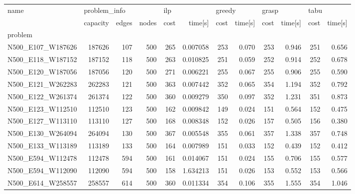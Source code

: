 \begin{landscape}
\begin{table}
\centering
\begin{tabular}{lrrrrrrrrrrr}
\toprule
name & \multicolumn{3}{l}{problem\_info} & \multicolumn{2}{l}{ilp} & \multicolumn{2}{l}{greedy} & \multicolumn{2}{l}{grasp} & \multicolumn{2}{l}{tabu} \\
{} &     capacity & edges & nodes & cost &   time[s] &   cost & time[s] &  cost & time[s] & cost & time[s] \\
problem            &              &       &       &      &           &        &         &       &         &      &         \\
\midrule
N500\_E107\_W187626  &       187626 &   107 &   500 &  265 &  0.007058 &    253 &   0.070 &   253 &   0.946 &  251 &   0.656 \\
N500\_E118\_W187152  &       187152 &   118 &   500 &  263 &  0.010825 &    251 &   0.059 &   252 &   0.914 &  252 &   0.678 \\
N500\_E120\_W187056  &       187056 &   120 &   500 &  271 &  0.006221 &    255 &   0.067 &   255 &   0.906 &  255 &   0.590 \\
N500\_E121\_W262283  &       262283 &   121 &   500 &  363 &  0.007442 &    352 &   0.065 &   354 &   1.194 &  352 &   0.792 \\
N500\_E122\_W261374  &       261374 &   122 &   500 &  360 &  0.009279 &    350 &   0.097 &   352 &   1.231 &  351 &   0.873 \\
N500\_E123\_W112510  &       112510 &   123 &   500 &  162 &  0.009842 &    149 &   0.024 &   151 &   0.564 &  152 &   0.475 \\
N500\_E127\_W113110  &       113110 &   127 &   500 &  168 &  0.008348 &    152 &   0.026 &   157 &   0.505 &  156 &   0.380 \\
N500\_E130\_W264094  &       264094 &   130 &   500 &  367 &  0.005548 &    355 &   0.061 &   357 &   1.338 &  357 &   0.748 \\
N500\_E133\_W113189  &       113189 &   133 &   500 &  164 &  0.007989 &    151 &   0.033 &   152 &   0.439 &  152 &   0.412 \\
N500\_E594\_W112478  &       112478 &   594 &   500 &  161 &  0.014067 &    151 &   0.024 &   155 &   0.706 &  155 &   0.577 \\
N500\_E594\_W112090  &       112090 &   594 &   500 &  158 &  1.634213 &    151 &   0.026 &   153 &   0.552 &  153 &   0.566 \\
N500\_E614\_W258557  &       258557 &   614 &   500 &  360 &  0.011334 &    354 &   0.106 &   355 &   1.555 &  354 &   1.046 \\

\end{tabular}
\end{table}
\end{landscape}
